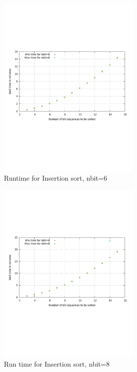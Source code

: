 \documentclass{acm_proc_article-sp}
\begin{document}
\begin{figure}[!h] %
\centering
\includegraphics[width=7cm]{fsort4.pdf} 
\caption{Runtime for Insertion sort, nbit=6} 
\label{fig:image_sf4} %
\end{figure}

\begin{figure}[!h] %
\centering
\includegraphics[width=7cm]{fsort5.pdf} 
\caption{Run time for Insertion sort, nbit=8} 
\label{fig:image_sf5} %
\end{figure}
\end{document}
